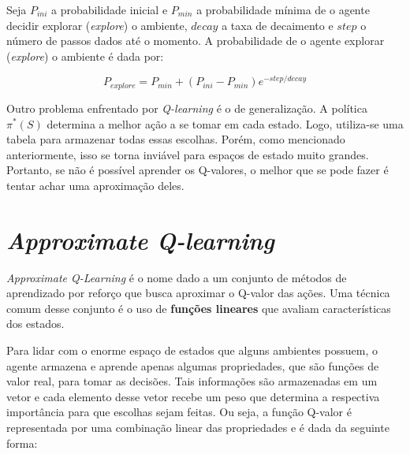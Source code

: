 Seja $P_{ini}$ a probabilidade inicial e $P_{min}$ a probabilidade mínima de o agente decidir explorar (\textit{explore}) o ambiente, $decay$ a taxa de decaimento e $step$ o número de passos dados até o momento.
A probabilidade de o agente explorar (\textit{explore}) o ambiente é dada por:

\begin{equation} \label{eq:exp_exp_prob}
P_{explore} = P_{min} + (P_{ini} - P_{min})e^{-step/decay}
\end{equation}

Outro problema enfrentado por \textit{Q-learning} é o de generalização.
A política $\pi^{*}(S)$ determina a melhor ação a se tomar em cada estado.
Logo, utiliza-se uma tabela para armazenar todas essas escolhas.
Porém, como mencionado anteriormente, isso se torna inviável para espaços de estado muito grandes.
Portanto, se não é possível aprender os Q-valores, o melhor que se pode fazer é tentar achar uma aproximação deles.


\section{\textit{Approximate Q-learning}}
\label{sec:aql}

\textit{Approximate Q-Learning} é o nome dado a um conjunto de métodos de aprendizado por reforço que busca aproximar o Q-valor das ações.
Uma técnica comum desse conjunto é o uso de \textbf{funções lineares} que avaliam características dos estados.

Para lidar com o enorme espaço de estados que alguns ambientes possuem, o agente armazena e aprende apenas algumas propriedades, que são funções de valor real, para tomar as decisões.
Tais informações são armazenadas em um vetor e cada elemento desse vetor recebe um peso que determina a respectiva importância para que escolhas sejam feitas. Ou seja, a função Q-valor é representada por uma combinação linear das propriedades e é dada da seguinte forma:

